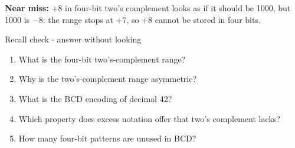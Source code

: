 \documentclass[11pt]{article}
\begin{document}
\begin{keepsection}
\begin{keepsection}
\begin{notebox}\textbf{Near miss:} +8 in four-bit two’s complement looks as if it should be 1000, but 1000 is \ensuremath{-}8: the range stops at +7, so +8 cannot be stored in four bits.\end{notebox}

\begin{recallbox}{Recall check \ensuremath{\cdot} answer without looking}
\begin{enumerate}
\item What is the four-bit two’s-complement range?
\item Why is the two’s-complement range asymmetric?
\item What is the BCD encoding of decimal 42?
\item Which property does excess notation offer that two’s complement lacks?
\item How many four-bit patterns are unused in BCD?
\end{enumerate}

\end{recallbox}
\end{keepsection}
\end{keepsection}
\end{document}

